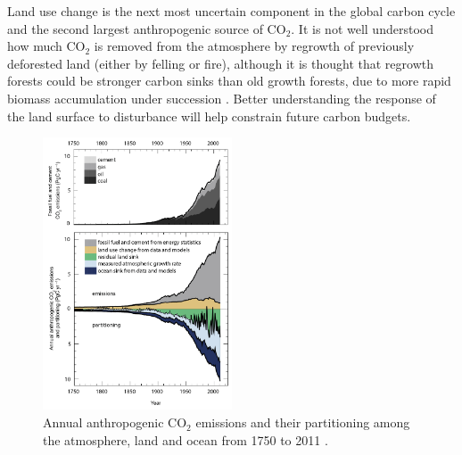 Land use change is the next most uncertain component in the global carbon cycle and the second largest anthropogenic source of CO\(_{2}\). It is not well understood how much CO\(_{2}\) is removed from the atmosphere by regrowth of previously deforested land (either by felling or fire), although it is thought that regrowth forests could be stronger carbon sinks than old growth forests, due to more rapid biomass accumulation under succession \citep{pan2011large}. Better understanding the response of the land surface to disturbance will help constrain future carbon budgets. 





\begin{figure}[ht]
    \centering
    \includegraphics[width=0.5\textwidth]{./img/intro/ipcc_fig6_8.jpg}
    \caption[Annual anthropogenic CO$_{2}$ emissions and their partitioning]{Annual anthropogenic CO$_{2}$ emissions and their partitioning among the atmosphere, land and ocean from 1750 to 2011  \citep{ciais2014carbon}.}
    \label{fig:ipcc_fig6.8}
\end{figure}

